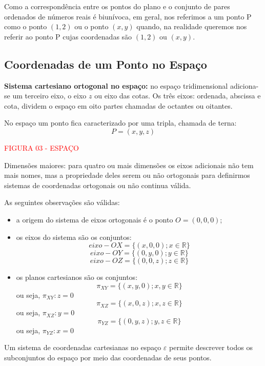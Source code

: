 \documentclass[oneside,a4paper,12pt]{article}
\begin{document}
 Como a correspondência entre os pontos do plano e o conjunto de pares ordenados de números reais é biunívoca, em geral, nos referimos a um ponto P como o ponto $(1,2)$ ou o ponto $(x,y)$ quando, na realidade queremos nos referir ao ponto P cujas coordenadas são $(1,2)$ ou $(x,y)$.
 
 
\subsection{Coordenadas de um Ponto no Espaço} 
 
{\bf Sistema cartesiano ortogonal no espaço:} no espaço tridimensional adiciona-se um terceiro eixo, o eixo $z$ ou eixo das cotas. Os três eixos: ordenada, abscissa e cota, dividem o espaço em oito partes chamadas de octantes ou oitantes.
 
No espaço um ponto fica caracterizado por uma tripla, chamada de terna: $$P = (x,y,z)$$

\vspace{180pt}
\begin{center}
	\textcolor{red}{FIGURA 03 - ESPAÇO}
\end{center}


Dimensões maiores: para quatro ou mais dimensões os eixos adicionais não tem mais nomes, mas a propriedade deles serem ou não ortogonais para definirmos sistemas de coordenadas ortogonais ou não continua válida.

As seguintes observações são válidas:
\begin{itemize}
	\item a origem do sistema de eixos ortogonais é o ponto $O = (0,0,0)$;
	\item os eixos do sistema são os conjuntos: \\
	$$ eixo - OX = \{(x,0,0) ; x \in \mathbb{R} \}$$
	$$eixo - OY = \{(0,y,0) ; y \in \mathbb{R} \}$$
	$$eixo - OZ = \{(0,0,z) ; z \in \mathbb{R} \}$$
	\item os planos cartesianos são os conjuntos: \\
	$$\pi_{XY} = \{(x,y,0); x,y \in \mathbb{R} \}$$
	ou seja, $\pi_{XY} : z = 0$ \\
	$$\pi_{XZ} = \{(x,0,z); x,z \in \mathbb{R} \}$$
	ou seja, $\pi_{XZ} : y = 0$ \\	
	$$\pi_{YZ} = \{(0,y,z); y,z \in \mathbb{R} \}$$
	ou seja, $\pi_{YZ} : x = 0$ 	
\end{itemize}

Um sistema de coordenadas cartesianas no espaço $\varepsilon$ permite descrever todos os subconjuntos do espaço por meio das coordenadas de seus pontos.
\end{document}
